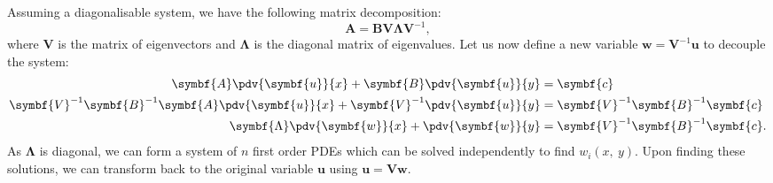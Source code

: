 \documentclass{article}
\theoremstyle{definition}
\begin{document}
Assuming a diagonalisable system, we have the following matrix
decomposition:
\begin{equation*}
    \symbf{A} = \symbf{B} \symbf{V} \symbf{\Lambda} \symbf{V}^{-1},
\end{equation*}
where \(\symbf{V}\) is the matrix of eigenvectors and \(\symbf{\Lambda}\)
is the diagonal matrix of eigenvalues. Let us now define a new variable
\(\symbf{w} = \symbf{V}^{-1} \symbf{u}\) to decouple the system:
\begin{align*}
    \symbf{A} \pdv{\symbf{u}}{x} + \symbf{B} \pdv{\symbf{u}}{y}                                    & = \symbf{c}                                \\
    \symbf{V}^{-1} \symbf{B}^{-1} \symbf{A} \pdv{\symbf{u}}{x} + \symbf{V}^{-1} \pdv{\symbf{u}}{y} & = \symbf{V}^{-1} \symbf{B}^{-1} \symbf{c}  \\
    \symbf{\Lambda} \pdv{\symbf{w}}{x} + \pdv{\symbf{w}}{y}                                        & = \symbf{V}^{-1} \symbf{B}^{-1} \symbf{c}.
\end{align*}
As \(\symbf{\Lambda}\) is diagonal, we can form a system of \(n\) first
order PDEs which can be solved independently to find
\(w_i\left( x,\: y \right)\). Upon finding these solutions, we can
transform back to the original variable \(\symbf{u}\) using
\(\symbf{u} = \symbf{V} \symbf{w}\).
\end{document}
